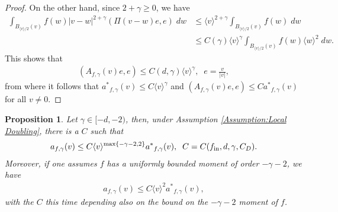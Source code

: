 \documentclass[12pt,american]{amsart}
\numberwithin{equation}{section}
\theoremstyle{plain}
\newtheorem{prop}[thm]{Proposition}
\theoremstyle{definition}                  %
\def\astar{{a^*}}
\def\fin{f_{\textnormal{in}}}
\begin{document}
\begin{proof}
  On the other hand, since $2+\gamma\geq 0$, we have
  \begin{align*}
    \int_{B_{\langle v\rangle/2}(v)}f(w)|v-w|^{2+\gamma}(\Pi(v-w)e,e)\;dw & \leq \langle v\rangle^{2+\gamma}\int_{B_{\langle v\rangle/2}(v)}f(w)\;dw\\
	  & \leq C(\gamma) \langle v\rangle^\gamma\int_{B_{\langle v\rangle/2}(v)}f(w)\langle w\rangle^2\;dw.
  \end{align*}	  
  This shows that
  \begin{align*}
    (A_{f,\gamma}(v)e,e)\leq C(d,\gamma)\langle v\rangle^\gamma,\;\;e=\frac{v}{|v|},  
  \end{align*}
  from where it follows that $\astar_{f,\gamma}(v)\leq C\langle v\rangle^\gamma$ and $(A_{f,\gamma}(v)e,e)\leq C\astar_{f,\gamma}(v)$ for all $v\neq 0$.
\end{proof}


\begin{prop}\label{prop:a vs a star gamma below -2}
  Let $\gamma \in [-d,-2)$, then, under Assumption \ref{Assumption:Local Doubling}, there is a $C$ such that 
  \begin{align*}  
    a_{f,\gamma}(v)\leq C\langle v\rangle^{\max\{-\gamma-2,2\}}\astar_{f,\gamma}(v),\;\; C=C(\fin,d,\gamma,C_D).
  \end{align*}
  Moreover, if one  assumes $f$ has a uniformly bounded moment of order $-\gamma-2$, we have
  \begin{align*}  
    a_{f,\gamma}(v)\leq C\langle v\rangle^{2}\astar_{f,\gamma}(v),
  \end{align*}
  with the $C$ this time depending also on the bound on the $-\gamma-2$ moment of $f$.
\end{prop}
\end{document}

